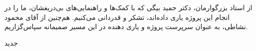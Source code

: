

\begin{center}
\end{center}

از استاد بزرگوارمان، دکتر حمید بیگی که با کمک‌ها و راهنمایی‌های بی‌دریغشان، ما را در انجام این پروژه یاری داده‌اند، تشکر و قدردانی می‌کنیم.
هم‌چنین از آقای محمود نشاطی، به عنوان سرپرست پروژه و یاری دهنده در این مسیر صمیمانه سپاس‌گزاریم.

‌جدید
